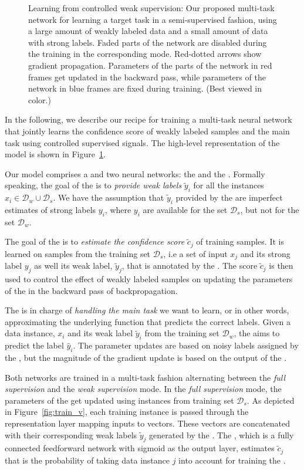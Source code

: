 \begin{figure}[!htbp]
\begin{subfigure}[t]{\textwidth}
    \end{subfigure}%
    \caption{Learning from controlled weak supervision: Our proposed multi-task network for learning a target task in a semi-supervised fashion, using a large amount of weakly labeled data and a small amount of data with strong labels.
    Faded parts of the network are disabled during the training in the corresponding mode. Red-dotted arrows show gradient propagation. Parameters of the parts of the network in red frames get updated in the backward pass, while parameters of the network in blue frames are fixed during training. (Best viewed in color.)}
    \label{fig:model_cws}
\end{figure}

In the following, we describe our recipe for training a multi-task neural network that jointly learns the confidence score of weakly labeled samples and the main task using controlled supervised signals. The high-level representation of the model is shown in Figure~\ref{fig:model_cws}. 

Our model comprises a \wa and two neural networks: the \cnet and the \tnet. Formally speaking, the goal of the \wa is to \emph{provide weak labels} $\tilde{y}_i$ for all the instances $x_i \in \mathcal{D}_w \cup \mathcal{D}_s$. We have the assumption that $\tilde{y}_i$ provided by the \wa are imperfect estimates of strong labels $y_i$, where $y_i$ are available for the set $\mathcal{D}_s$, but not for the set $\mathcal{D}_w$.

The goal of the \cnet is to \emph{estimate the confidence score} $\tilde{c}_j$ of training samples. It is learned on samples from the training set $\mathcal{D}_s$, i.e a set of input $x_j$ and its strong label $y_j$ as well its weak label,  $\tilde{y}_j$,  that is annotated by the \wa.
The score $\tilde{c}_j$ is then used to control the effect of weakly labeled samples on updating the parameters of the \tnet in the backward pass of backpropagation.

The \tnet is in charge of \emph{handling the main task} we want to learn, or in other words, approximating the underlying function that predicts the correct labels. 
Given a data instance, $x_i$ and its weak label $\tilde{y}_i$ from the training set $\mathcal{D}_w$, the \tnet aims to predict the label $\hat{y}_i$. 
The \tnet parameter updates are based on noisy labels assigned by the \wa, but the magnitude of the gradient update is based on the output of the \cnet. 

Both networks are trained in a multi-task fashion alternating between the \emph{full supervision} and the \emph{weak supervision} mode.  
In the \emph{full supervision} mode, the parameters of the \cnet get updated using instances from training set $\mathcal{D}_s$.  
As depicted in Figure~\ref{fig:train_v}, each training instance is passed through the representation layer mapping inputs to vectors. These vectors are concatenated with their corresponding weak labels $\tilde{y}_j$ generated by the \wa.
The \cnet, which is a fully connected feedforward network with sigmoid as the output layer, estimates $\tilde{c}_j$ that is the probability of taking data instance $j$ into account for training the \tnet.

